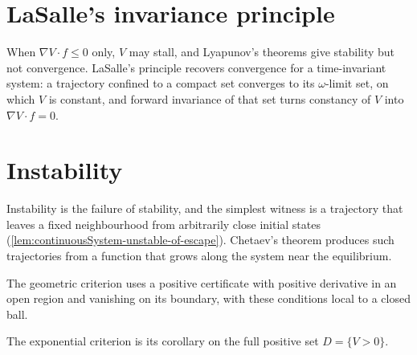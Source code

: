 


\section{LaSalle's invariance principle}

When $\nabla V \cdot f \le 0$ only, $V$ may stall, and Lyapunov's theorems give stability but not
convergence.  LaSalle's principle recovers convergence for a time-invariant system: a trajectory
confined to a compact set converges to its $\omega$-limit set, on which $V$ is constant, and
forward invariance of that set turns constancy of $V$ into $\nabla V \cdot f = 0$.






\section{Instability}

Instability is the failure of stability, and the simplest witness is a trajectory that leaves a
fixed neighbourhood from arbitrarily close initial states
(\cref{lem:continuousSystem-unstable-of-escape}).  Chetaev's theorem produces such trajectories
from a function that grows along the system near the equilibrium.

The geometric criterion uses a positive certificate with positive derivative in an open
region and vanishing on its boundary, with these conditions local to a closed ball.


The exponential criterion is its corollary on the full positive set $D=\{V>0\}$.

